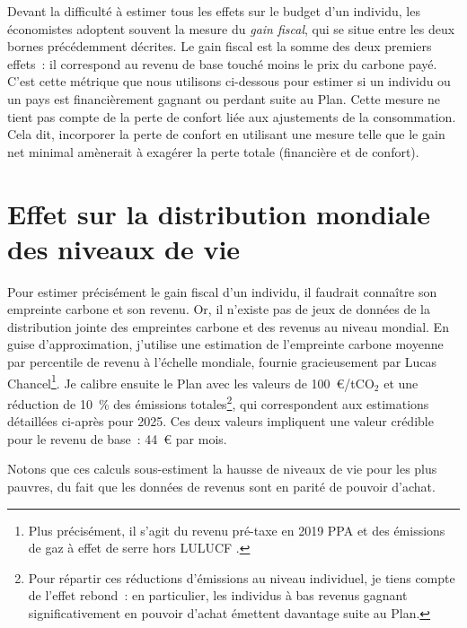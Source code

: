 \documentclass[a5paper,french,openany]{memoir}
\begin{document}
Devant la difficulté à estimer tous les effets sur le budget d'un individu, les économistes adoptent souvent la mesure du \textit{gain fiscal}, qui se situe entre les deux bornes précédemment décrites. Le gain fiscal est la somme des deux premiers effets~: il correspond au revenu de base touché moins le prix du carbone payé. C'est cette métrique que nous utilisons ci-dessous pour estimer si un individu ou un pays est financièrement gagnant ou perdant suite au Plan. Cette mesure ne tient pas compte de la perte de confort liée aux ajustements de la consommation. Cela dit, incorporer la perte de confort en utilisant une mesure %
telle que le gain net minimal amènerait à exagérer la perte totale (financière et de confort).

\section{Effet sur la distribution mondiale des niveaux de vie}\label{app:revenus}

Pour estimer précisément le gain fiscal d'un individu, il faudrait connaître son empreinte carbone et son revenu. Or, il n'existe pas de jeux de données de la distribution jointe des empreintes carbone et des revenus au niveau mondial. En guise d'approximation, j'utilise une estimation de l'empreinte carbone moyenne par percentile de revenu à l'échelle mondiale, fournie gracieusement par Lucas Chancel\footnote{Plus précisément, il s'agit du revenu pré-taxe en \textit{\texteuro{}} 2019 PPA et des émissions de gaz à effet de serre hors LULUCF
.}. Je calibre ensuite le Plan avec les valeurs de 100~\euro{}/tCO$_\text{2}$ et une réduction de 10~\% des émissions totales\footnote{Pour répartir ces réductions d'émissions au niveau individuel, je tiens compte de l'effet rebond~: en particulier, les individus à bas revenus gagnant significativement en pouvoir d'achat émettent davantage suite au Plan.}, qui correspondent aux estimations détaillées ci-après pour 2025. Ces deux valeurs impliquent une valeur crédible pour le revenu de base~: 44~\euro{} par mois. 

Notons que ces calculs sous-estiment la hausse de niveaux de vie pour les plus pauvres, du fait que les données de revenus sont en parité de pouvoir d'achat.
\end{document}
